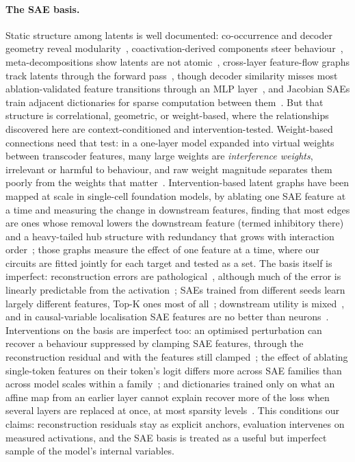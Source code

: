 \documentclass[10pt]{article}
\begin{document}
\paragraph{The SAE basis.}
Static structure among latents is well documented: co-occurrence and decoder geometry reveal modularity~\citep{li2025geometry}, coactivation-derived components steer behaviour~\citep{deng2026coactivation}, meta-decompositions show latents are not atomic~\citep{leask2025canonical}, cross-layer feature-flow graphs track latents through the forward pass~\citep{laptev2025feature}, though decoder similarity misses most ablation-validated feature transitions through an MLP layer~\citep{droste2026decoder}, and Jacobian SAEs train adjacent dictionaries for sparse computation between them~\citep{farnik2025jacobian}.
But that structure is correlational, geometric, or weight-based, where the relationships discovered here are context-conditioned and intervention-tested.
Weight-based connections need that test: in a one-layer model expanded into virtual weights between transcoder features, many large weights are \emph{interference weights}, irrelevant or harmful to behaviour, and raw weight magnitude separates them poorly from the weights that matter~\citep{turner2026interference}.
Intervention-based latent graphs have been mapped at scale in single-cell foundation models, by ablating one SAE feature at a time and measuring the change in downstream features, finding that most edges are ones whose removal lowers the downstream feature (termed inhibitory there)~\citep{kendiukhov2026causal} and a heavy-tailed hub structure with redundancy that grows with interaction order~\citep{kendiukhov2026exhaustive}; those graphs measure the effect of one feature at a time, where our circuits are fitted jointly for each target and tested as a set.
The basis itself is imperfect: reconstruction errors are pathological~\citep{gurnee2024pathological}, although much of the error is linearly predictable from the activation~\citep{engels2025dark}; SAEs trained from different seeds learn largely different features, Top-K ones most of all~\citep{paulo2025sparse}; downstream utility is mixed~\citep{smith2025negative}, and in causal-variable localisation SAE features are no better than neurons~\citep{mueller2025mib}.
Interventions on the basis are imperfect too: an optimised perturbation can recover a behaviour suppressed by clamping SAE features, through the reconstruction residual and with the features still clamped~\citep{cui2026sae}; the effect of ablating single-token features on their token's logit differs more across SAE families than across model scales within a family~\citep{cho2026single}; and dictionaries trained only on what an affine map from an earlier layer cannot explain recover more of the loss when several layers are replaced at once, at most sparsity levels~\citep{poduval2026resae}.
This conditions our claims: reconstruction residuals stay as explicit anchors, evaluation intervenes on measured activations, and the SAE basis is treated as a useful but imperfect sample of the model's internal variables.
\end{document}
